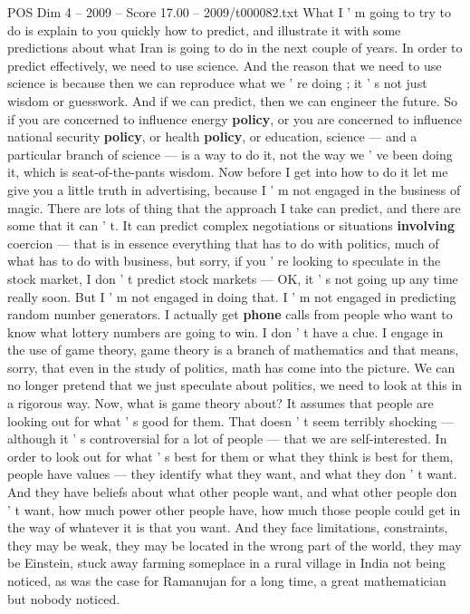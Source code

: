 \begin{textsample}{POS Dim 4 – 2009 – Score 17.00 – 2009/t000082.txt}  \label{ex:f4_pos_048}
What I ' m going to try to do is explain to you quickly how to predict, and illustrate it with some predictions about what Iran is going to do in the next couple of years.
In order to predict effectively, we need to use science.
And the reason that we need to use science is because then we can reproduce what we ' re doing ; it ' s not just wisdom or guesswork.
And if we can predict, then we can engineer the future.
So if you are concerned to influence energy \textbf{policy}, or you are concerned to influence national security \textbf{policy}, or health \textbf{policy}, or education, science — and a particular branch of science — is a way to do it, not the way we ' ve been doing it, which is seat-of-the-pants wisdom.
Now before I get into how to do it let me give you a little truth in advertising, because I ' m not engaged in the business of magic.
There are lots of thing that the approach I take can predict, and there are some that it can ' t.
It can predict complex negotiations or situations \textbf{involving} coercion — that is in essence everything that has to do with politics, much of what has to do with business, but sorry, if you ' re looking to speculate in the stock market, I don ' t predict stock markets — OK, it ' s not going up any time really soon.
But I ' m not engaged in doing that.
I ' m not engaged in predicting random number generators.
I actually get \textbf{phone} calls from people who want to know what lottery numbers are going to win.
I don ' t have a clue.
I engage in the use of game theory, game theory is a branch of mathematics and that means, sorry, that even in the study of politics, math has come into the picture.
We can no longer pretend that we just speculate about politics, we need to look at this in a rigorous way.
Now, what is game theory about?
It assumes that people are looking out for what ' s good for them.
That doesn ' t seem terribly shocking — although it ' s controversial for a lot of people — that we are self-interested.
In order to look out for what ' s best for them or what they think is best for them, people have values — they identify what they want, and what they don ' t want.
And they have beliefs about what other people want, and what other people don ' t want, how much power other people have, how much those people could get in the way of whatever it is that you want.
And they face limitations, constraints, they may be weak, they may be located in the wrong part of the world, they may be Einstein, stuck away farming someplace in a rural village in India not being noticed, as was the case for Ramanujan for a long time, a great mathematician but nobody noticed.

\end{textsample}
